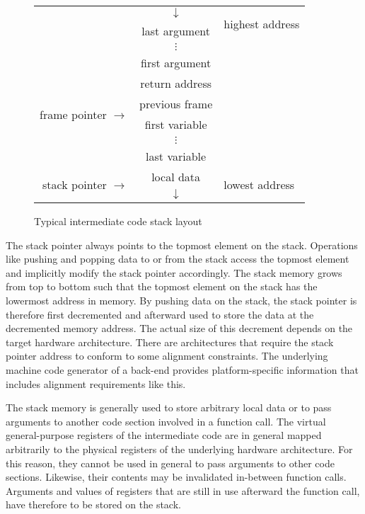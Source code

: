 \begin{figure}
\centering
\sffamily\begin{tabular}{r|c|l}
& $\downarrow$ & \multirow{2}{*}{highest address} \\
\cline{2-2} & last argument \\ & $\vdots$ \\ & first argument \\
\cline{2-2} & return address \\
\cline{2-2} \multirow{2}{*}{frame pointer $\rightarrow$} & previous frame \\
\cline{2-2} & first variable \\ & $\vdots$ \\ & last variable \\
\cline{2-2} \multirow{2}{*}{stack pointer $\rightarrow$} & local data & \multirow{2}{*}{lowest address} \\
\cline{2-2} & $\downarrow$ \\
\end{tabular}\normalfont
\caption{Typical intermediate code stack layout}
\label{fig:cdstackframe}
\end{figure}

The stack pointer always points to the topmost element on the stack.
Operations like pushing and popping data to or from the stack access the topmost element and implicitly modify the stack pointer accordingly.
The stack memory grows from top to bottom such that the topmost element on the stack has the lowermost address in memory.
By pushing data on the stack, the stack pointer is therefore first decremented and afterward used to store the data at the decremented memory address.
The actual size of this decrement depends on the target hardware architecture.
There are architectures that require the stack pointer address to conform to some alignment constraints.
The underlying machine code generator of a back-end provides platform-specific information that includes alignment requirements like this.

The stack memory is generally used to store arbitrary local data or to pass arguments to another code section involved in a function call.
The virtual general-purpose registers of the intermediate code are in general mapped arbitrarily to the physical registers of the underlying hardware architecture.
For this reason, they cannot be used in general to pass arguments to other code sections.
Likewise, their contents may be invalidated in-between function calls.
Arguments and values of registers that are still in use afterward the function call, have therefore to be stored on the stack.


